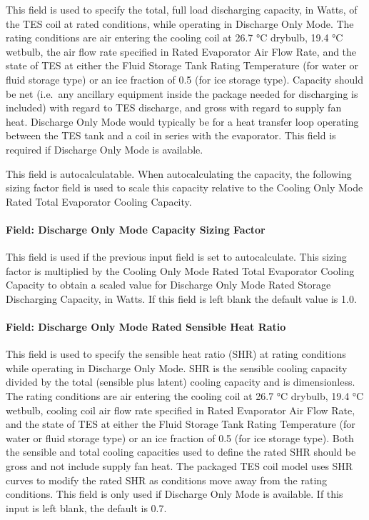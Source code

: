 This field is used to specify the total, full load discharging capacity, in Watts, of the TES coil at rated conditions, while operating in Discharge Only Mode. The rating conditions are air entering the cooling coil at 26.7 °C drybulb, 19.4 °C wetbulb, the air flow rate specified in Rated Evaporator Air Flow Rate, and the state of TES at either the Fluid Storage Tank Rating Temperature (for water or fluid storage type) or an ice fraction of 0.5 (for ice storage type). Capacity should be net (i.e.~any ancillary equipment inside the package needed for discharging is included) with regard to TES discharge, and gross with regard to supply fan heat. Discharge Only Mode would typically be for a heat transfer loop operating between the TES tank and a coil in series with the evaporator. This field is required if Discharge Only Mode is available.

This field is autocalculatable. When autocalculating the capacity, the following sizing factor field is used to scale this capacity relative to the Cooling Only Mode Rated Total Evaporator Cooling Capacity.

\paragraph{Field: Discharge Only Mode Capacity Sizing Factor}\label{field-discharge-only-mode-capacity-sizing-factor}

This field is used if the previous input field is set to autocalculate. This sizing factor is multiplied by the Cooling Only Mode Rated Total Evaporator Cooling Capacity to obtain a scaled value for Discharge Only Mode Rated Storage Discharging Capacity, in Watts. If this field is left blank the default value is 1.0.

\paragraph{Field: Discharge Only Mode Rated Sensible Heat Ratio}\label{field-discharge-only-mode-rated-sensible-heat-ratio}

This field is used to specify the sensible heat ratio (SHR) at rating conditions while operating in Discharge Only Mode. SHR is the sensible cooling capacity divided by the total (sensible plus latent) cooling capacity and is dimensionless. The rating conditions are air entering the cooling coil at 26.7 °C drybulb, 19.4 °C wetbulb, cooling coil air flow rate specified in Rated Evaporator Air Flow Rate, and the state of TES at either the Fluid Storage Tank Rating Temperature (for water or fluid storage type) or an ice fraction of 0.5 (for ice storage type). Both the sensible and total cooling capacities used to define the rated SHR should be gross and not include supply fan heat. The packaged TES coil model uses SHR curves to modify the rated SHR as conditions move away from the rating conditions. This field is only used if Discharge Only Mode is available. If this input is left blank, the default is 0.7.

